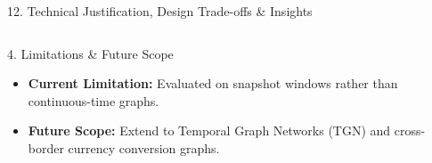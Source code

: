 \documentclass[aspectratio=169, 11pt]{beamer}
\begin{document}
\begin{frame}{12. Technical Justification, Design Trade-offs \& Insights}
\begin{columns}[T]
        \begin{block}{4. Limitations \& Future Scope}
            \scriptsize
            \begin{itemize}\setlength{\itemsep}{1pt}\setlength{\parskip}{0pt}
                \item \textbf{Current Limitation:} Evaluated on snapshot windows rather than continuous-time graphs.
                \item \textbf{Future Scope:} Extend to Temporal Graph Networks (TGN) and cross-border currency conversion graphs.
            \end{itemize}
        \end{block}
    \end{columns}
\end{frame}

\end{document}
